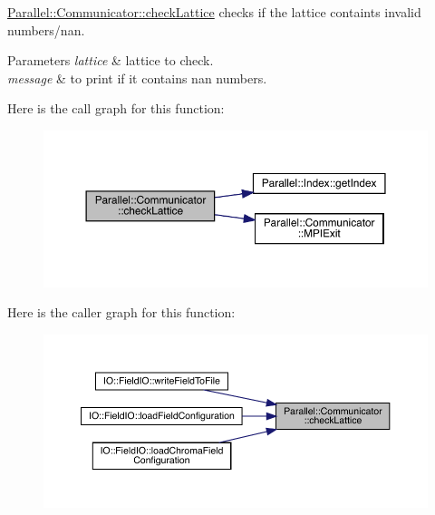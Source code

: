 \mbox{\hyperlink{class_parallel_1_1_communicator_a9471bf9448f34a0b4575310a3c54af61}{Parallel\+::\+Communicator\+::check\+Lattice}} checks if the lattice containts invalid numbers/nan. 


\begin{DoxyParams}{Parameters}
{\em lattice} & lattice to check. \\
\hline
{\em message} & to print if it contains nan numbers. \\
\hline
\end{DoxyParams}
Here is the call graph for this function\+:
\nopagebreak
\begin{figure}[H]
\begin{center}
\leavevmode
\includegraphics[width=350pt]{class_parallel_1_1_communicator_a9471bf9448f34a0b4575310a3c54af61_cgraph}
\end{center}
\end{figure}
Here is the caller graph for this function\+:
\nopagebreak
\begin{figure}[H]
\begin{center}
\leavevmode
\includegraphics[width=350pt]{class_parallel_1_1_communicator_a9471bf9448f34a0b4575310a3c54af61_icgraph}
\end{center}
\end{figure}
\mbox{\label{class_parallel_1_1_communicator_acd7e2f114728e5207093743a58ab3a40}} 
